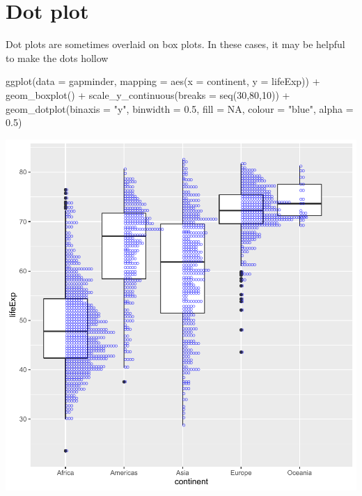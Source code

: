 \documentclass[
]{book}
\makeatletter
\newenvironment{Shaded}{\begin{snugshade}}{\end{snugshade}}
\newcommand{\AttributeTok}[1]{\textcolor[rgb]{0.61,0.61,0.61}{#1}}
\newcommand{\ConstantTok}[1]{\textcolor[rgb]{0,0,0}{#1}}
\newcommand{\DecValTok}[1]{\textcolor[rgb]{0.06,0.06,0.06}{#1}}
\newcommand{\FloatTok}[1]{\textcolor[rgb]{0.06,0.06,0.06}{#1}}
\newcommand{\FunctionTok}[1]{\textcolor[rgb]{0,0,0}{#1}}
\newcommand{\NormalTok}[1]{#1}
\newcommand{\SpecialCharTok}[1]{\textcolor[rgb]{0,0,0}{#1}}
\newcommand{\StringTok}[1]{\textcolor[rgb]{0.5,0.5,0.5}{#1}}
\newenvironment{kframe}{%
\medskip{}
\setlength{\fboxsep}{.8em}
 \def\at@end@of@kframe{}%
 \ifinner\ifhmode%
  \def\at@end@of@kframe{\end{minipage}}%
  \begin{minipage}{\columnwidth}%
 \fi\fi%
 \def\FrameCommand##1{\hskip\@totalleftmargin \hskip-\fboxsep
 \colorbox{shadecolor}{##1}\hskip-\fboxsep
     \hskip-\linewidth \hskip-\@totalleftmargin \hskip\columnwidth}%
 \MakeFramed {\advance\hsize-\width
   \@totalleftmargin\z@ \linewidth\hsize
   \@setminipage}}%
 {\par\unskip\endMakeFramed%
 \at@end@of@kframe}
\renewenvironment{Shaded}{\begin{kframe}}{\end{kframe}}
\makeatother
\begin{document}
\hypertarget{dot-plot}{%
\section{Dot plot}\label{dot-plot}}

Dot plots are sometimes overlaid on box plots. In these cases, it may be helpful to make the dots hollow

\begin{Shaded}
\begin{Highlighting}[]
\FunctionTok{ggplot}\NormalTok{(}\AttributeTok{data =}\NormalTok{ gapminder, }\AttributeTok{mapping =} \FunctionTok{aes}\NormalTok{(}\AttributeTok{x =}\NormalTok{ continent, }\AttributeTok{y =}\NormalTok{ lifeExp)) }\SpecialCharTok{+}
  \FunctionTok{geom\_boxplot}\NormalTok{() }\SpecialCharTok{+}
  \FunctionTok{scale\_y\_continuous}\NormalTok{(}\AttributeTok{breaks =} \FunctionTok{seq}\NormalTok{(}\DecValTok{30}\NormalTok{,}\DecValTok{80}\NormalTok{,}\DecValTok{10}\NormalTok{)) }\SpecialCharTok{+}
  \FunctionTok{geom\_dotplot}\NormalTok{(}\AttributeTok{binaxis =} \StringTok{"y"}\NormalTok{, }\AttributeTok{binwidth =} \FloatTok{0.5}\NormalTok{, }\AttributeTok{fill =} \ConstantTok{NA}\NormalTok{, }\AttributeTok{colour =} \StringTok{"blue"}\NormalTok{, }\AttributeTok{alpha =} \FloatTok{0.5}\NormalTok{) }
\end{Highlighting}
\end{Shaded}

\begin{center}\includegraphics[width=0.7\linewidth,keepaspectratio]{Multivariable_Data_Analysis_files/figure-latex/unnamed-chunk-88-1} \end{center}
\end{document}

